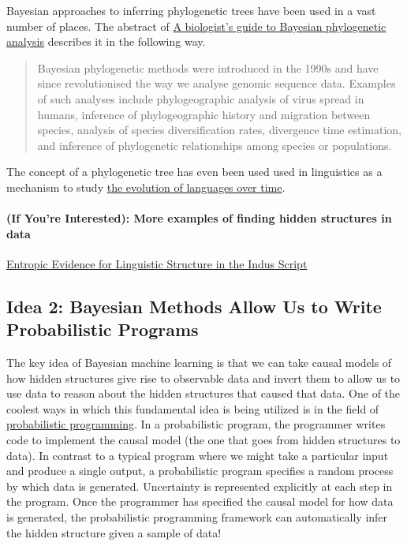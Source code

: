 \documentclass[assignment01_Solutions]{subfiles}
\begin{document}
Bayesian approaches to inferring phylogenetic trees have been used in a vast number of places.  The abstract of \href{https://www.ncbi.nlm.nih.gov/pmc/articles/PMC5624502/}{A biologist’s guide to Bayesian phylogenetic analysis} describes it in the following way.
\begin{quote}
Bayesian phylogenetic methods were introduced in the 1990s and have since revolutionised the way we analyse genomic sequence data. Examples of such analyses include phylogeographic analysis of virus spread in humans, inference of phylogeographic history and migration between species, analysis of species diversification rates, divergence time estimation, and inference of phylogenetic relationships among species or populations.
\end{quote}

The concept of a phylogenetic tree has even been used used in linguistics as a mechanism to study \href{https://journals.plos.org/plosone/article?id=10.1371/journal.pone.0180908}{the evolution of languages over time}.

\paragraph{(If You're Interested): More examples of finding hidden structures in data}

\href{https://homes.cs.washington.edu/~rao/ScienceIndus.pdf}{Entropic Evidence for Linguistic Structure in the Indus Script}

\subsection*{Idea 2: Bayesian Methods Allow Us to Write Probabilistic Programs}

The key idea of Bayesian machine learning is that we can take causal models of how hidden structures give rise to observable data and invert them to allow us to use data to reason about the hidden structures that caused that data.  One of the coolest ways in which this fundamental idea is being utilized is in the field of \href{https://en.wikipedia.org/wiki/Probabilistic_programming}{probabilistic programming}.  In a probabilistic program, the programmer writes code to implement the causal model (the one that goes from hidden structures to data).  In contrast to a typical program where we might take a particular input and produce a single output, a probabilistic program specifies a random process by which data is generated.  Uncertainty is represented explicitly at each step in the program.  Once the programmer has specified the causal model for how data is generated, the probabilistic programming framework can automatically infer the hidden structure given a sample of data!
\end{document}
